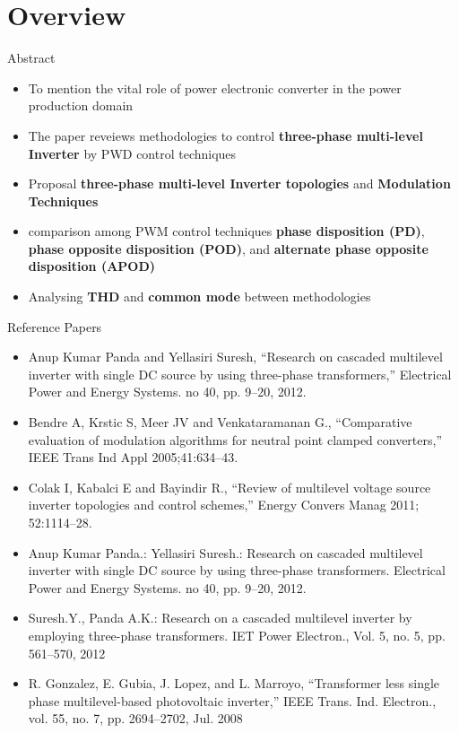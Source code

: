 \documentclass[
	11pt, %
]{beamer}
\begin{document}
\section{Overview}
\begin{frame}{Abstract}
	\begin{itemize}
		\scriptsize
		\item{To mention the vital role of power electronic converter in the power production domain}
		\item{The paper reveiews methodologies to control \textbf{three-phase multi-level Inverter} by PWD control techniques}    
		\item{Proposal \textbf{three-phase multi-level Inverter topologies} and \textbf{Modulation Techniques}}
		\item{comparison among PWM control techniques \textbf{phase disposition (PD)}, 
				\textbf{phase opposite disposition (POD)}, and \textbf{alternate phase opposite disposition (APOD)}}
		\item{Analysing \textbf{THD} and \textbf{common mode} between methodologies}
	\end{itemize}
\end{frame}


\begin{frame}{Reference Papers}
	\begin{itemize}
		\scriptsize
		\item{Anup Kumar Panda and Yellasiri Suresh, “Research on cascaded
		multilevel inverter with single DC source by using three-phase
		transformers,” Electrical Power and Energy Systems. no 40, pp. 9–20,
		2012.}
		\item{Bendre A, Krstic S, Meer JV and Venkataramanan G., “Comparative
		evaluation of modulation algorithms for neutral point clamped
		converters,” IEEE Trans Ind Appl 2005;41:634–43.}
		\item{  Colak I, Kabalci E and Bayindir R., “Review of multilevel voltage
		source inverter topologies and control schemes,” Energy Convers
		Manag 2011; 52:1114–28.}
		\item{  Anup Kumar Panda.: Yellasiri Suresh.: Research on cascaded
		multilevel inverter with single DC source by using three-phase
		transformers. Electrical Power and Energy Systems. no 40, pp. 9–20,
		2012.} 
		\item{Suresh.Y., Panda A.K.: Research on a cascaded multilevel inverter by
		employing three-phase transformers. IET Power Electron., Vol. 5, no.
		5, pp. 561–570, 2012}
		\item{R. Gonzalez, E. Gubia, J. Lopez, and L. Marroyo, “Transformer less
		single phase multilevel-based photovoltaic inverter,” IEEE Trans. Ind.
		Electron., vol. 55, no. 7, pp. 2694–2702, Jul. 2008}
	\end{itemize}
\end{frame}
\end{document}

